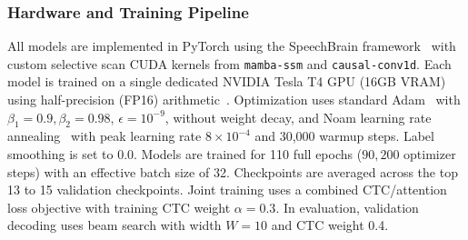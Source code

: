\documentclass[journal]{IEEEtran}
\begin{document}
\subsubsection{Hardware and Training Pipeline}
All models are implemented in PyTorch using the SpeechBrain framework~\cite{ravanelli2021speechbrain} with custom selective scan CUDA kernels from \texttt{mamba-ssm} and \texttt{causal-conv1d}. Each model is trained on a single dedicated NVIDIA Tesla T4 GPU (16GB VRAM) using half-precision (FP16) arithmetic~\cite{micikevicius2018mixed}. Optimization uses standard Adam~\cite{kingma2015adam} with $\beta_1 = 0.9, \beta_2 = 0.98$, $\epsilon = 10^{-9}$, without weight decay, and Noam learning rate annealing~\cite{vaswani2017attention} with peak learning rate $8 \times 10^{-4}$ and 30,000 warmup steps. Label smoothing is set to 0.0. Models are trained for 110 full epochs ($90,200$ optimizer steps) with an effective batch size of 32. Checkpoints are averaged across the top 13 to 15 validation checkpoints. Joint training uses a combined CTC/attention loss objective with training CTC weight $\alpha = 0.3$. In evaluation, validation decoding uses beam search with width $W=10$ and CTC weight 0.4.

\begin{table}[!t]
\centering
\caption{Training Convergence Trajectory of ConMamba-Small on Curated EJUST Across 110 Epochs ($90,200$ Optimization Steps).}
\label{tab:convergence_dynamics}
\end{table}
\end{document}

